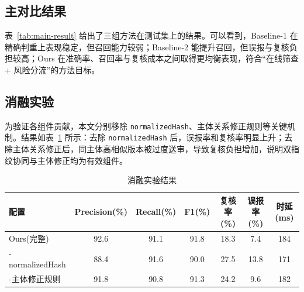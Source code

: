 \documentclass[UTF8,a4paper,zihao=5]{ctexart}
\begin{document}
\subsection{主对比结果}
表~\ref{tab:main-result} 给出了三组方法在测试集上的结果。可以看到，Baseline-1 在精确判重上表现稳定，但召回能力较弱；Baseline-2 能提升召回，但误报与复核负担较高；Ours 在准确率、召回率与复核成本之间取得更均衡表现，符合“在线筛查 + 风险分流”的方法目标。

\begin{table}[htbp]
  \centering
  \caption{主对比结果}
  \label{tab:main-result}
  \small
  \setlength{\tabcolsep}{3pt}
\end{table}

\subsection{消融实验}
为验证各组件贡献，本文分别移除 \texttt{normalizedHash}、主体关系修正规则等关键机制。结果如表~\ref{tab:ablation-result} 所示：去除 \texttt{normalizedHash} 后，误报率和复核率明显上升；去除主体关系修正后，同主体高相似版本被过度送审，导致复核负担增加，说明双指纹协同与主体修正均为有效组件。

\begin{table}[htbp]
  \centering
  \caption{消融实验结果}
  \label{tab:ablation-result}
  \begin{tabular}{lcccccc}
    \toprule
    配置 & Precision(\%) & Recall(\%) & F1(\%) & 复核率(\%) & 误报率(\%) & 时延(ms) \\
    \midrule
    Ours(完整) & 92.6 & 91.1 & 91.8 & 18.3 & 7.4 & 184 \\
    -normalizedHash & 88.4 & 91.6 & 90.0 & 27.5 & 13.8 & 171 \\
    -主体修正规则 & 91.8 & 90.8 & 91.3 & 24.2 & 9.6 & 182 \\
    \bottomrule
  \end{tabular}
\end{table}
\end{document}
